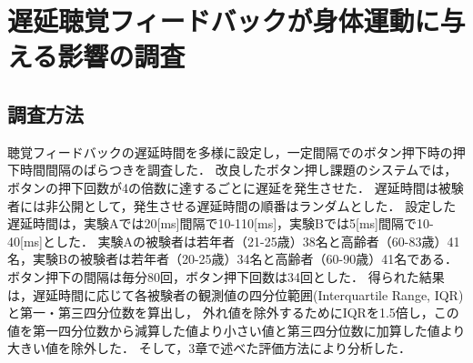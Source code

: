 \section{遅延聴覚フィードバックが身体運動に与える影響の調査}
\subsection{調査方法}
聴覚フィードバックの遅延時間を多様に設定し，一定間隔でのボタン押下時の押下時間間隔のばらつきを調査した．
改良したボタン押し課題のシステムでは，ボタンの押下回数が4の倍数に達するごとに遅延を発生させた．
遅延時間は被験者には非公開として，発生させる遅延時間の順番はランダムとした．
設定した遅延時間は，実験Aでは20[ms]間隔で10-110[ms]，実験Bでは5[ms]間隔で10-40[ms]とした．
実験Aの被験者は若年者（21-25歳）38名と高齢者（60-83歳）41名，実験Bの被験者は若年者（20-25歳）34名と高齢者（60-90歳）41名である．
ボタン押下の間隔は毎分80回，ボタン押下回数は34回とした．
得られた結果は，遅延時間に応じて各被験者の観測値の四分位範囲(Interquartile Range, IQR)と第一・第三四分位数を算出し，
外れ値を除外するためにIQRを1.5倍し，この値を第一四分位数から減算した値より小さい値と第三四分位数に加算した値より大きい値を除外した．
そして，3章で述べた評価方法により分析した．
